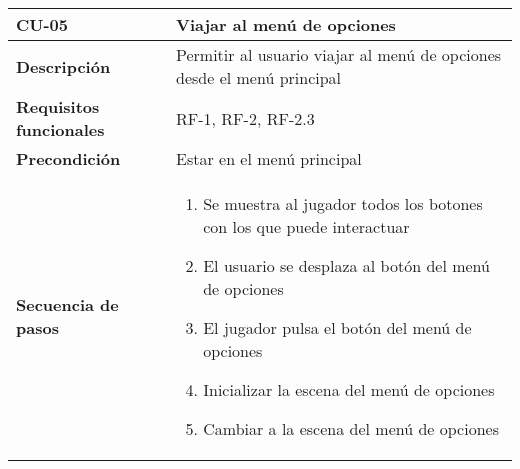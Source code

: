 \begin{longtable}{l|l}
\begin{minipage}{0.25\columnwidth}
\textbf{CU-05} 
\end{minipage}
&
\begin{minipage}{0.65\columnwidth}
Viajar al menú de opciones
\end{minipage}
\\ \hline

\begin{minipage}{0.25\columnwidth}
\textbf{Descripción} 
\end{minipage}
&
\begin{minipage}{0.65\columnwidth}
Permitir al usuario viajar al menú de opciones desde el menú principal
\end{minipage}
\\ \hline

\begin{minipage}{0.25\columnwidth}
\textbf{Requisitos funcionales} 
\end{minipage}
&
\begin{minipage}{0.65\columnwidth}
RF-1, RF-2, RF-2.3
\end{minipage}
\\ \hline

\begin{minipage}{0.25\columnwidth}
\textbf{Precondición} 
\end{minipage}
&
\begin{minipage}{0.65\columnwidth}
Estar en el menú principal
\end{minipage}
\\ \hline

\begin{minipage}{0.25\columnwidth}
\textbf{Secuencia de pasos} 
\end{minipage}
&
\begin{minipage}{0.65\columnwidth}
\begin{enumerate}
\item
Se muestra al jugador todos los botones con los que puede interactuar
\item
El usuario se desplaza al botón del menú de opciones
\item
El jugador pulsa el botón del menú de opciones
\item
Inicializar la escena del menú de opciones
\item
Cambiar a la escena del menú de opciones
\end{enumerate}
\end{minipage}
\\ \hline


\end{longtable}
